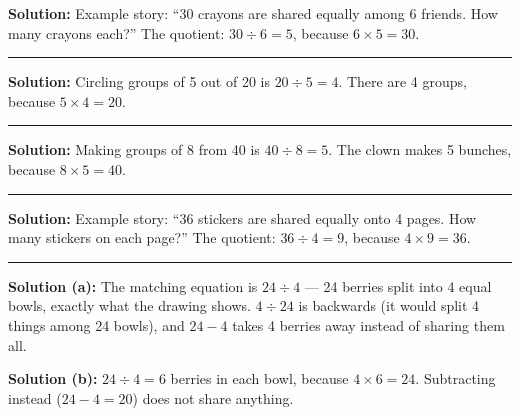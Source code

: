 \documentclass[12pt]{article}
\begin{document}

\textbf{Solution:} Example story: ``30 crayons are shared equally among 6 friends. How many crayons each?'' The quotient: $30 \div 6 = 5$, because $6 \times 5 = 30$. 

\noindent\rule{\linewidth}{0.2pt}


\textbf{Solution:} Circling groups of 5 out of 20 is $20 \div 5 = 4$. There are 4 groups, because $5 \times 4 = 20$. 

\noindent\rule{\linewidth}{0.2pt}


\textbf{Solution:} Making groups of 8 from 40 is $40 \div 8 = 5$. The clown makes 5 bunches, because $8 \times 5 = 40$. 

\noindent\rule{\linewidth}{0.2pt}


\textbf{Solution:} Example story: ``36 stickers are shared equally onto 4 pages. How many stickers on each page?'' The quotient: $36 \div 4 = 9$, because $4 \times 9 = 36$. 

\noindent\rule{\linewidth}{0.2pt}


\textbf{Solution (a):} The matching equation is $24 \div 4$ --- 24 berries split into 4 equal bowls, exactly what the drawing shows. $4 \div 24$ is backwards (it would split 4 things among 24 bowls), and $24 - 4$ takes 4 berries away instead of sharing them all.

\textbf{Solution (b):} $24 \div 4 = 6$ berries in each bowl, because $4 \times 6 = 24$. Subtracting instead ($24 - 4 = 20$) does not share anything. 
\end{document}
